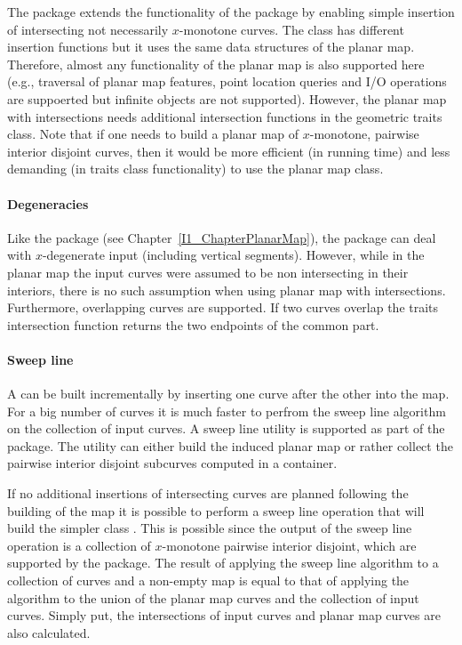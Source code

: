   The  package extends the
  functionality of the  package by enabling simple
  insertion of intersecting not necessarily $x$-monotone curves. The
   class has different insertion
  functions but it uses the same data structures of the planar
  map. Therefore, almost any functionality of the planar map is also
  supported here (e.g., traversal of planar map features, point
  location queries and I/O operations are suppoerted but infinite
  objects are not supported). However, the planar map with
  intersections needs additional intersection functions in the
  geometric traits class. Note that if one needs to build a planar map
  of $x$-monotone, pairwise interior disjoint curves, then it would be
  more efficient (in running time) and less demanding (in traits class
  functionality) to use the planar map class.

\paragraph{Degeneracies} 
  Like the  package (see
  Chapter~\ref{I1_ChapterPlanarMap}), the  package can deal with $x$-degenerate input (including
  vertical segments). However, while in the planar map the input
  curves were assumed to be non intersecting in their interiors, there
  is no such assumption when using planar map with
  intersections. Furthermore, overlapping curves are supported. If two
  curves overlap the traits intersection function returns the two
  endpoints of the common part.

\paragraph{Sweep line}
  A  can be built incrementally by
  inserting one curve after the other into the map. For a big number
  of curves it is much faster to perfrom the sweep line algorithm on
  the collection of input curves. A sweep line utility is supported as
  part of the package. The utility can either build the induced planar
  map or rather collect the pairwise interior disjoint subcurves
  computed in a container. 

  If no additional insertions of intersecting curves are planned
  following the building of the map it is possible to perform a sweep
  line operation that will build the simpler class .
  This is possible since the output of the sweep line operation is a
  collection of $x$-monotone pairwise interior disjoint, which are
  supported by the  package. The result of applying
  the sweep line algorithm to a collection of curves and a non-empty
  map is equal to that of applying the algorithm to the union of the
  planar map curves and the collection of input curves. Simply put,
  the intersections of input curves and planar map curves are also
  calculated.

